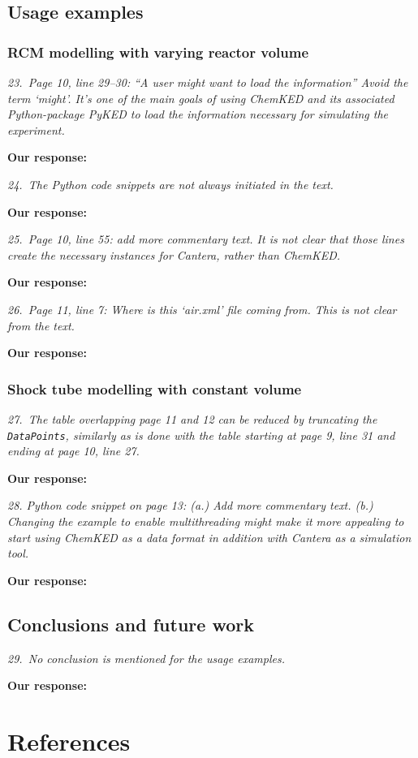\documentclass[a4paper,10pt]{elsarticle}
\begin{document}
\subsection*{Usage examples}
\subsubsection*{RCM modelling with varying reactor volume}

\textit{23.~Page 10, line 29--30: ``A user might want to load the information'' Avoid the term `might'. It's one of the main goals of using ChemKED and its associated Python-package PyKED to load the information necessary for simulating the experiment.}

\textbf{Our response:}


\textit{24.~The Python code snippets are not always initiated in the text.}

\textbf{Our response:}


\textit{25.~Page 10, line 55: add more commentary text. It is not clear that those lines create the
necessary instances for Cantera, rather than ChemKED.}

\textbf{Our response:}


\textit{26.~Page 11, line 7: Where is this `air.xml' file coming from. This is not clear from the text.}

\textbf{Our response:}


\subsubsection*{Shock tube modelling with constant volume}

\textit{27.~The table overlapping page 11 and 12 can be reduced by truncating the \texttt{DataPoints}, similarly as is done with the table starting at page 9, line 31 and ending at page 10, line 27.}

\textbf{Our response:}

\textit{28. Python code snippet on page 13: (a.) Add more commentary text. (b.) Changing the example to enable multithreading might make it more appealing to start using ChemKED as a data format in addition with Cantera as a simulation tool.}

\textbf{Our response:}


\subsection*{Conclusions and future work}

\textit{29.~No conclusion is mentioned for the usage examples.}

\textbf{Our response:}

\section*{References}


\end{document}
